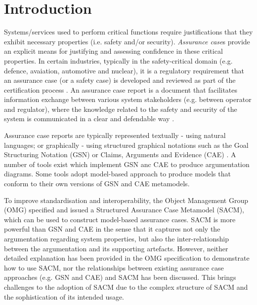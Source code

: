 \section{Introduction}
Systems/services used to perform critical functions require justifications that they exhibit necessary properties (i.e. safety and/or security). \textit{Assurance case}s provide an explicit means for justifying and assessing confidence in these critical properties. In certain industries, typically in the safety-critical domain (e.g. defence, avaiation, automotive and nuclear), it is a regulatory requirement that an assurance case (or a safety case) is developed and reviewed as part of the certification process \cite{healthFound}.
An assurance case report is a document that facilitates information exchange between various system stakeholders (e.g. between operator and regulator), where the knowledge related to the safety and security of the system is communicated in a clear and defendable way \cite{hawkins2013assurance}. 

Assurance case reports are typically represented textually - using natural languages; or graphically - using structured graphical notations such as the Goal Structuring Notation (GSN) \cite{kelly2004goal} or Claims, Arguments and Evidence (CAE) \cite{cae}. A number of tools exist which implement GSN anc CAE to produce argumentation diagrams. Some tools adopt model-based approach to produce models that conform to their own versions of GSN and CAE metamodels. 

To improve standardisation and interoperability, the Object Management Group (OMG) specified and issued a Structured Assurance Case Metamodel (SACM), which can be used to construct model-based assurance cases. 
SACM is more powerful than GSN and CAE in the sense that it captures not only the argumentation regarding system properties, but also the inter-relationship between the argumentation and its supporting artefacts. However, neither detailed explanation has been provided in the OMG specification to demonstrate how to use SACM, nor the relationships between existing assurance case approaches (e.g. GSN and CAE) and SACM has been discussed. This brings challenges to the adoption of SACM due to the complex structure of SACM and the sophistication of its intended usage. 

